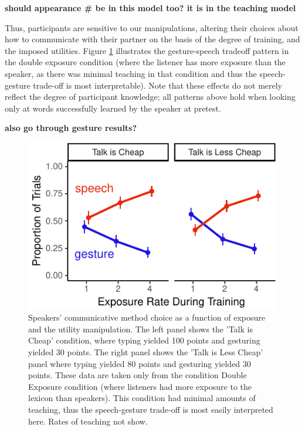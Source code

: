 \documentclass[10pt, letterpaper]{article}
\newenvironment{CodeChunk}{}{}
\begin{document}
\textbf{should appearance \# be in this model too? it is in the teaching
model}

Thus, participants are sensitive to our manipulations, altering their
choices about how to communicate with their partner on the basis of the
degree of training, and the imposed utilities. Figure
\ref{fig:exp_speech_gesture} illustrates the gesture-speech tradeoff
pattern in the double exposure condition (where the listener has more
exposure than the speaker, as there was minimal teaching in that
condition and thus the speech-gesture trade-off is most interpretable).
Note that these effects do not merely reflect the degree of participant
knowledge; all patterns above hold when looking only at words
successfully learned by the speaker at pretest.

\textbf{also go through gesture results?}

\begin{CodeChunk}
\begin{figure}[tb]

{\centering \includegraphics{figs/exp_speech_gesture-1} 

}

\caption[Speakers' communicative method choice as a function of exposure and the utility manipulation]{Speakers' communicative method choice as a function of exposure and the utility manipulation. The left panel shows the 'Talk is Cheap' condition, where typing yielded 100 points and gesturing yielded 30 points. The right panel shows the 'Talk is Less Cheap' panel where typing yielded 80 points and gesturing yielded 30 points. These data are taken only from the condition Double Exposure condition (where listeners had more exposure to the lexicon than speakers). This condition had minimal amounts of teaching, thus the speech-gesture trade-off is most easily interpreted here. Rates of teaching not show.}\label{fig:exp_speech_gesture}
\end{figure}
\end{CodeChunk}
\end{document}
